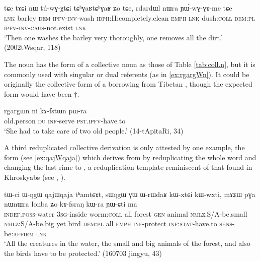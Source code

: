 \begin{exe}
\ex \label{ex:rdardWl}
\gll tɕe tɤɕi nɯ tú-wɣ-χtɕi tɕʰɣaʁtɕʰɣaʁ ʑo tɕe, rdardɯl nɯra ɲɯ́-wɣ-ɣɤ-me tɕe \\
\textsc{lnk} barley \textsc{dem} \textsc{ipfv}-\textsc{inv}-wash \textsc{idph}:II:completely.clean \textsc{emph} \textsc{lnk} dush:\textsc{coll} \textsc{dem:pl} \textsc{ipfv}-\textsc{inv}-\textsc{caus}-not.exist \textsc{lnk} \\
\glt `Then one washes the barley very thoroughly, one removes all the dirt.' (2002tWsqar, 118)
\end{exe}
 
The noun  has the form of a collective noun as those of Table \ref{tab:coll.n}, but it is commonly used with singular or dual referents (as in \ref{ex:rgargWn}). It could be originally the collective form of a borrowing from Tibetan , though the expected form would have been $\dagger$. 
 
\begin{exe}
\ex \label{ex:rgargWn}
\gll  rgargɯn ni kɤ-fstɯn pɯ-ra \\
old.person \textsc{du} \textsc{inf}-serve \textsc{pst.ipfv}-have.to \\
\glt `She had to take care of two old people.' (14-tApitaRi, 34)
\end{exe}

A third reduplicated collective derivation is only attested by one example, the form  (see \ref{ex:qajWqaja}) which derives from   by reduplicating the whole word and changing the last rime to , a reduplication template reminiscent of that found in Khroskyabs (see \citealt{lai13fuyin}, \citealt[22-24]{lai17khroskyabs}).

\begin{exe}
\ex \label{ex:qajWqaja}
\gll
tɯ-ci ɯ-ŋgɯ qajɯqaja tʰamtɕɤt, sɯŋgɯ ɣɯ ɯ-rɯdaʁ kɯ-xtɕi kɯ-wxti, mɤʑɯ pɣa nɯnɯra lonba ʑo kɤ-fsraŋ kɯ-ra ɲɯ-ɕti ma \\
\textsc{indef.poss}-water \textsc{3sg}-inside worm:\textsc{coll} all forest \textsc{gen} animal \textsc{nmlz}:S/A-be.small \textsc{nmlz}:S/A-be.big yet bird \textsc{dem:pl} all \textsc{emph} \textsc{inf}-protect \textsc{inf:stat}-have.to \textsc{sens}-be:\textsc{affirm} \textsc{lnk} \\
\glt `All the creatures in the water, the small and big animals of the forest, and also the birds have to be protected.' (160703 jingyu, 43)
\end{exe}

